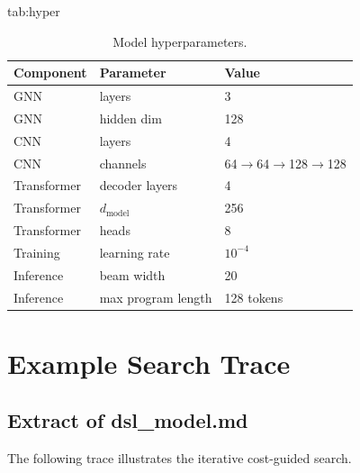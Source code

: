 \documentclass[final]{nesy2027}
\begin{document}
\begin{table}[htbp]
\floatconts
  {tab:hyper}
  {\caption{Model hyperparameters.}}
  {%
  \begin{tabular}{lll}
  \toprule
  \bfseries Component & \bfseries Parameter & \bfseries Value \\
  \midrule
  GNN         & layers             & 3 \\
  GNN         & hidden dim         & 128 \\
  CNN         & layers             & 4 \\
  CNN         & channels           & 64$\to$64$\to$128$\to$128 \\
  Transformer & decoder layers     & 4 \\
  Transformer & $d_{\mathrm{model}}$ & 256 \\
  Transformer & heads              & 8 \\
  Training    & learning rate      & $10^{-4}$ \\
  Inference   & beam width         & 20 \\
  Inference   & max program length & 128 tokens \\
  \bottomrule
  \end{tabular}}
\end{table}

\section{Example Search Trace}

\subsection{Extract of dsl\_model.md}
\label{apd:trace}

The following trace illustrates the iterative cost-guided search.
\end{document}
